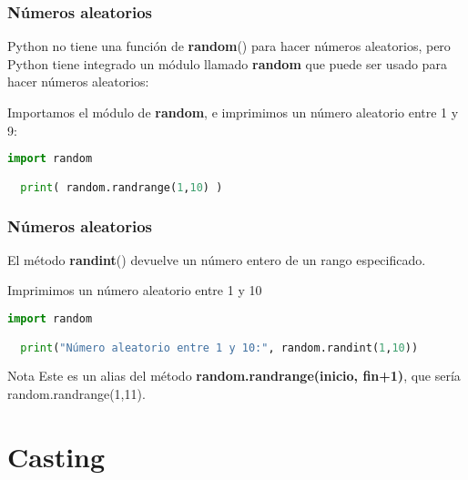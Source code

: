 \begin{frame}[fragile]
  \frametitle{Números aleatorios}

  Python no tiene una función de \textbf{random}() para
  hacer números aleatorios, pero Python tiene integrado un módulo llamado
  \textbf{random} que puede ser usado para hacer números
  aleatorios:

  \vspace{\baselineskip}
  Importamos el módulo de \textbf{random}, e imprimimos un
  número aleatorio entre 1 y 9:

  \begin{lstlisting}[language=Python]
  import random

  print( random.randrange(1,10) )
  \end{lstlisting}
\end{frame}

\begin{frame}[fragile]
  \frametitle{Números aleatorios}

  El método \textbf{randint}() devuelve un número
  entero de un rango especificado.

  \vspace{\baselineskip}
  Imprimimos un número aleatorio entre 1 y 10

  \vspace{\baselineskip}
  \begin{lstlisting}[language=Python]
  import random

  print("Número aleatorio entre 1 y 10:", random.randint(1,10))
  \end{lstlisting}

  \begin{alertblock}{Nota}
    Este es un alias del método \textbf{random.randrange(inicio, fin+1)},
    que sería random.randrange(1,11).
  \end{alertblock}
\end{frame}

\section{Casting}

